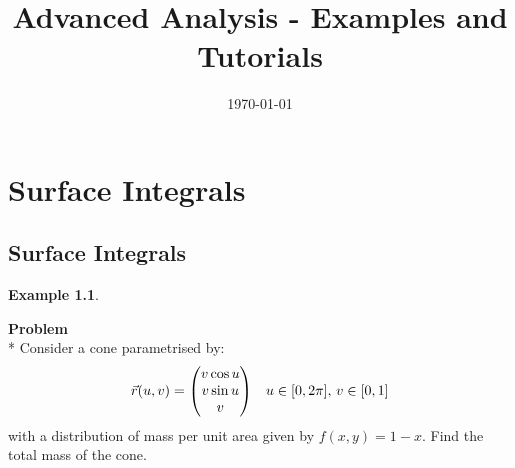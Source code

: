 \documentclass[10pt,a4paper]{report}
\theoremstyle{definition}
\theoremstyle{plain}
\theoremstyle{definition}
\newtheorem{example}{Example}[section]
\theoremstyle{plain}
\newenvironment{problem}{\par\begin{tcolorbox}\textbf{Problem}\\*}{\end{tcolorbox}}
\newenvironment{colvectorenvironment}{\left(\!\!\!\begin{array}{c}}{\end{array}\!\!\!\right)}
\begin{document}
\parindent0pt

\title{Advanced Analysis - Examples and Tutorials}
\date{\today}
\maketitle

\tableofcontents

\chapter{Surface Integrals}
\section{Surface Integrals}
\begin{example}\ 
    \begin{problem}
        Consider a cone parametrised by:
        \[
            \vec{r}(u,v) =
            \begin{colvectorenvironment}
                v\cos u\\
                v\sin u\\
                v
            \end{colvectorenvironment}\quad
            u\in[0,2\pi],\,
            v\in[0,1]
        \]
        with a distribution of mass per unit area given by $f(x,y) = 1-x$. Find the total mass of the cone.
    \end{problem}
    

\end{example}
\end{document}
